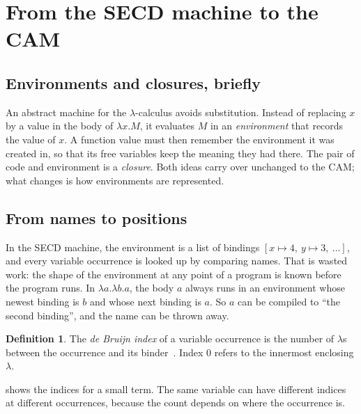 \documentclass[11pt,a4paper]{article}
\theoremstyle{definition}
\newtheorem{definition}{Definition}
\theoremstyle{plain}
\begin{document}
\section{From the SECD machine to the CAM}\label{sec:fromsecd}

\subsection{Environments and closures, briefly}

An abstract machine for the $\lambda$-calculus avoids substitution. Instead of
replacing $x$ by a value in the body of $\lambda x.M$, it evaluates $M$ in an
\emph{environment} that records the value of $x$. A function value must then
remember the environment it was created in, so that its free variables keep
the meaning they had there. The pair of code and environment is a
\emph{closure}. Both ideas carry over unchanged to the CAM; what changes is
how environments are represented.

\subsection{From names to positions}

In the SECD machine, the environment is a list of bindings
$[x\mapsto 4,\ y\mapsto 3,\ \dots]$, and every variable occurrence is looked
up by comparing names. That is wasted work: the shape of the environment at
any point of a program is known before the program runs. In
$\lambda a.\lambda b.a$, the body $a$ always runs in an environment whose
newest binding is $b$ and whose next binding is $a$. So $a$ can be compiled to
``the second binding'', and the name can be thrown away.

\begin{definition}
The \emph{de Bruijn index} of a variable occurrence is the number of
$\lambda$s between the occurrence and its binder~\cite{debruijn72}. Index 0
refers to the innermost enclosing $\lambda$.
\end{definition}

 shows the indices for a small term. The same variable can
have different indices at different occurrences, because the count depends
on where the occurrence is.
\end{document}
